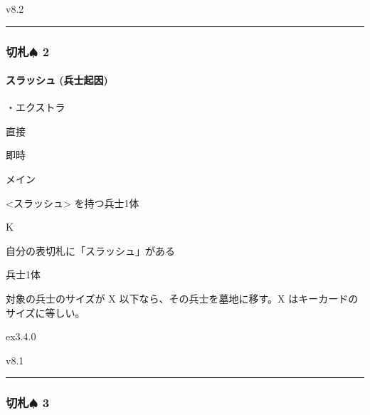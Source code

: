 \documentclass[letterpaper,10pt,dvipdfmx]{sphinxmanual}
\begin{document}
\sphinxAtStartPar
{}  v8.2


\bigskip\hrule\bigskip



\subsubsection{切札{\normalsize $\spadesuit$} 2}
\label{\detokenize{auto/frameActionlist:id15}}

\paragraph{スラッシュ (兵士起因)}
\label{\detokenize{auto/frameActionlist:act-slash}}\label{\detokenize{auto/frameActionlist:id16}}
\sphinxAtStartPar
{}

\sphinxAtStartPar
・エクストラ

\sphinxAtStartPar
{} 直接

\sphinxAtStartPar
{} 即時

\sphinxAtStartPar
{} メイン

\sphinxAtStartPar
{} \textless{}スラッシュ\textgreater{} を持つ兵士1体

\sphinxAtStartPar
{} K

\sphinxAtStartPar
{}

\sphinxAtStartPar
自分の表切札に「スラッシュ」がある

\sphinxAtStartPar
{}

\sphinxAtStartPar
兵士1体

\sphinxAtStartPar
{}

\sphinxAtStartPar
対象の兵士のサイズが X 以下なら、その兵士を墓地に移す。X はキーカードのサイズに等しい。

\sphinxAtStartPar
{}  ex3.4.0

\sphinxAtStartPar
{}  v8.1


\bigskip\hrule\bigskip



\subsubsection{切札{\normalsize $\spadesuit$} 3}
\label{\detokenize{auto/frameActionlist:id17}}
\end{document}
